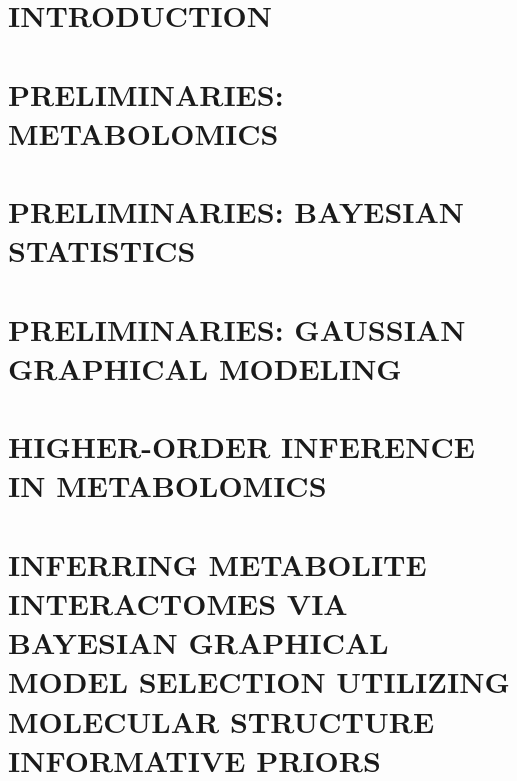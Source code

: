 \documentclass[final]{ulthesis}
\begin{document}
{ \setlength{\beforechapskip}{.75in} 
	\tableofcontents* \clearpage}
{ \setlength{\beforechapskip}{.75in}
	 \listoftables \clearpage}
{ \setlength{\beforechapskip}{.75in}
	 \listoffigures \clearpage}

\mainmatter

\chapter{INTRODUCTION}


\chapter{PRELIMINARIES: METABOLOMICS}


\chapter{PRELIMINARIES: BAYESIAN STATISTICS}


\chapter{PRELIMINARIES: GAUSSIAN GRAPHICAL MODELING}


\chapter{HIGHER-ORDER INFERENCE IN METABOLOMICS}


{ 
\chapter{INFERRING METABOLITE INTERACTOMES VIA BAYESIAN GRAPHICAL MODEL SELECTION UTILIZING MOLECULAR STRUCTURE INFORMATIVE PRIORS}

}
\end{document}
